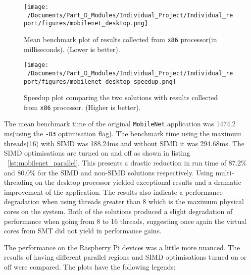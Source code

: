 \begin{figure}[htbp] %
	\centering
	\texttt{[image: ~/Documents/Part\_D\_Modules/Individual\_Project/Individual\_report/figures/mobilenet\_desktop.png]} %
	\caption{Mean benchmark plot of results collected from \texttt{x86} processor(in milliseconds). (Lower is better).}
	\label{fig:mobilenet_desktop_plot} %
\end{figure}

\begin{figure}[htbp] %
	\centering
	\texttt{[image: ~/Documents/Part\_D\_Modules/Individual\_Project/Individual\_report/figures/mobilenet\_desktop\_speedup.png]} %
	\caption{Speedup plot comparing the two solutions with results collected from \texttt{x86} processor. (Higher is better).}
	\label{fig:mobilenet_desktop_speedup} %
\end{figure}

The mean benchmark time of the original \texttt{MobileNet} application\cite{mobilenet_repo} was 1474.2 ms(using the \texttt{-O3} optimisation flag). The benchmark time using the maximum threads(16) with SIMD was 188.24ms and without SIMD it was 294.68ms. The SIMD optimisations are turned on and off as shown in listing  ~\ref{lst:mobilenet_parallel}. This presents a drastic reduction in run time of 87.2\% and 80.0\% for the SIMD and non-SIMD solutions respectively. Using multi-threading on the desktop processor yielded exceptional results and a dramatic improvement of the application. The results also indicate a performance degradation when using threads greater than 8 which is the maximum physical cores on the system. Both of the solutions produced a slight degradation of performance when going from 8 to 16 threads, suggesting once again the virtual cores from SMT did not yield in performance gains. 

The performance on the Raspberry Pi devices was a little more nuanced. The results of having different parallel regions and SIMD optimisations turned on or off were compared. The plots have the following legends:

